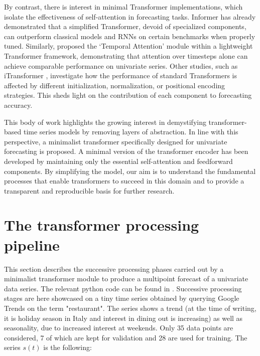 \documentclass[algorithms,article,submit,pdftex,moreauthors]{Definitions/mdpi}
\begin{document}
By contrast, there is interest in minimal Transformer implementations, which isolate the effectiveness of self-attention in forecasting tasks. Informer has already demonstrated that a simplified Transformer, devoid of specialized components, can outperform classical models and RNNs on certain benchmarks when properly tuned. Similarly, \citep{LSNP21} proposed the `Temporal Attention' module within a lightweight Transformer framework, demonstrating that attention over timesteps alone can achieve comparable performance on univariate series. Other studies, such as iTransformer \cite{LHZW24}, investigate how the performance of standard Transformers is affected by different initialization, normalization, or positional encoding strategies. This sheds light on the contribution of each component to forecasting accuracy.

This body of work highlights the growing interest in demystifying transformer-based time series models by removing layers of abstraction. In line with this perspective, a minimalist transformer specifically designed for univariate forecasting is proposed. A minimal version of the transformer encoder has been developed by maintaining only the essential self-attention and feedforward components. By simplifying the model, our aim is to understand the fundamental processes that enable transformers to succeed in this domain and to provide a transparent and reproducible basis for further research.


\section{The transformer processing pipeline} \label{sec:transformer}

This section describes the successive processing phases carried out by a minimalist transformer module to produce a multipoint forecast of a univariate data series. The relevant python code can be found in \cite{G25}. Successive processing stages are here showcased on a tiny time series obtained by querying Google Trends \cite{googletrends2025} on the term "restaurant". The series shows a trend (at the time of writing, it is holiday season in Italy and interest in dining out is increasing) as well as seasonality, due to increased interest at weekends. Only 35 data points are considered, 7 of which are kept for validation and 28 are used for training.
The series $s(t)$ is the following:
\end{document}
